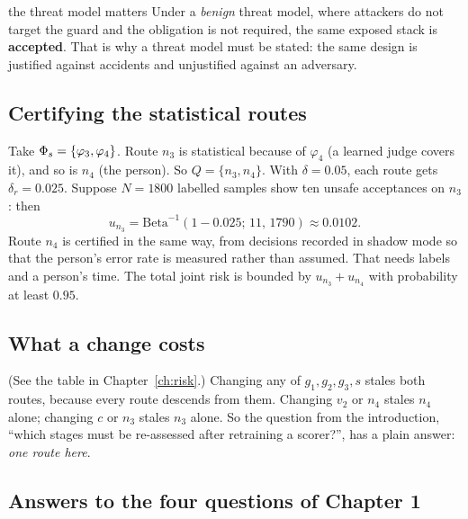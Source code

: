 \begin{example}{the threat model matters}
Under a \emph{benign} threat model, where attackers do not target the guard and the obligation  is not required, the same exposed stack is \textbf{accepted}. That is why a threat model must be stated: the same design is justified against accidents and unjustified against an adversary.
\end{example}

\subsection{Certifying the statistical routes}

Take $\Phi_s=\{\varphi_3,\varphi_4\}$. Route $n_3$ is statistical because of $\varphi_4$ (a learned judge covers it), and so is $n_4$ (the person). So $Q=\{n_3,n_4\}$. With $\delta=0.05$, each route gets $\delta_r=0.025$. Suppose $N=1800$ labelled samples show ten unsafe acceptances on $n_3$: then
\[
u_{n_3}=\mathrm{Beta}^{-1}(1-0.025;\,11,\,1790)\approx0.0102.
\]
Route $n_4$ is certified in the same way, from decisions recorded in shadow mode so that the person's error rate is measured rather than assumed. That needs labels and a person's time. The total joint risk is bounded by $u_{n_3}+u_{n_4}$ with probability at least $0.95$.

\subsection{What a change costs}

(See the table in Chapter~\ref{ch:risk}.) Changing any of $g_1,g_2,g_3,s$ stales both routes, because every route descends from them. Changing $v_2$ or $n_4$ stales $n_4$ alone; changing $c$ or $n_3$ stales $n_3$ alone. So the question from the introduction, ``which stages must be re-assessed after retraining a scorer?'', has a plain answer: \emph{one route here}.

\subsection{Answers to the four questions of Chapter 1}

